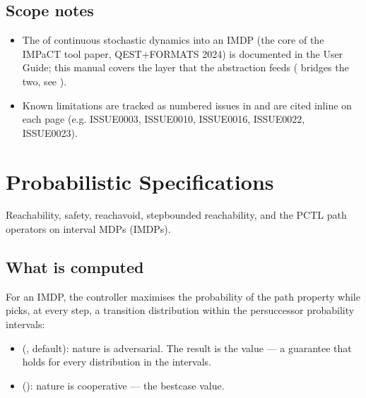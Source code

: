 \documentclass[a4paper,10pt,english]{sphinxmanual}
\begin{document}
\subsection{Scope notes}
\label{\detokenize{manual/index:scope-notes}}\begin{itemize}
\item {} 
\sphinxAtStartPar
The  of continuous stochastic dynamics into an IMDP (the core of the
IMPaCT tool paper, QEST+FORMATS 2024) is documented in the User Guide; this manual
covers the  layer that the abstraction feeds ( bridges the
two, see {\hyperref[\detokenize{manual/formats::doc}]{}}).

\item {} 
\sphinxAtStartPar
Known limitations are tracked as numbered issues in  and are cited
inline on each page (e.g. ISSUE\sphinxhyphen{}0003, ISSUE\sphinxhyphen{}0010, ISSUE\sphinxhyphen{}0016, ISSUE\sphinxhyphen{}0022, ISSUE\sphinxhyphen{}0023).

\end{itemize}

\sphinxstepscope


\section{Probabilistic Specifications}
\label{\detokenize{manual/specifications:probabilistic-specifications}}\label{\detokenize{manual/specifications::doc}}
\sphinxAtStartPar
Reachability, safety, reach\sphinxhyphen{}avoid, step\sphinxhyphen{}bounded reachability, and the PCTL path
operators on interval MDPs (IMDPs).


\subsection{What is computed}
\label{\detokenize{manual/specifications:what-is-computed}}
\sphinxAtStartPar
For an IMDP, the controller maximises the probability of the path property while
 picks, at every step, a transition distribution within the per\sphinxhyphen{}successor
probability intervals:
\begin{itemize}
\item {} 
\sphinxAtStartPar
{} (, default): nature is adversarial. The result is the
 value — a guarantee that holds for every distribution in the intervals.

\item {} 
\sphinxAtStartPar
{} (): nature is cooperative — the best\sphinxhyphen{}case value.

\end{itemize}
\end{document}
